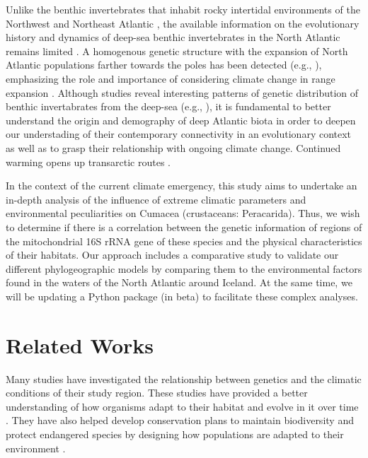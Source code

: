 Unlike the benthic invertebrates that inhabit rocky intertidal environments of the Northwest and Northeast Atlantic \citep{ilves_colonization_2010, jennings_phylogeographic_2014}, the available information on the evolutionary history and dynamics of deep-sea benthic invertebrates in the North Atlantic remains limited \citep{jennings_phylogeographic_2014}. A homogenous genetic structure with the expansion of North Atlantic populations farther towards the poles has been detected (e.g., \citep{aarbakke_discovery_2011}), emphasizing the role and importance of considering climate change in range expansion \citep{jennings_phylogeographic_2014}. Although studies reveal interesting patterns of genetic distribution of benthic invertabrates from the deep-sea (e.g., \citep{jennings_phylogeographic_2014}), it is fundamental to better understand the origin and demography of deep Atlantic biota in order to deepen our understading of their contemporary connectivity in an evolutionary context as well as to grasp their relationship with ongoing climate change. Continued warming opens up transarctic routes \citep{jennings_phylogeographic_2014}.

In the context of the current climate emergency, this study aims to undertake an in-depth analysis of the influence of extreme climatic parameters and environmental peculiarities on Cumacea (crustaceans: Peracarida). Thus, we wish to determine if there is a correlation between the genetic information of regions of the mitochondrial 16S rRNA gene of these species and the physical characteristics of their habitats. Our approach includes a comparative study to validate our different phylogeographic models by comparing them to the environmental factors found in the waters of the North Atlantic around Iceland. At the same time, we will be updating a Python package (in beta) to facilitate these complex analyses.

\section{Related Works}\label{related-works}
Many studies have investigated the relationship between genetics and the climatic conditions of their study region. These studies have provided a better understanding of how organisms adapt to their habitat and evolve in it over time \citep{barrett_molecular_2011, fc_genomic_2012}. They have also helped develop conservation plans to maintain biodiversity and protect endangered species by designing how populations are adapted to their environment \citep{balkenhol_identifying_2009}.

